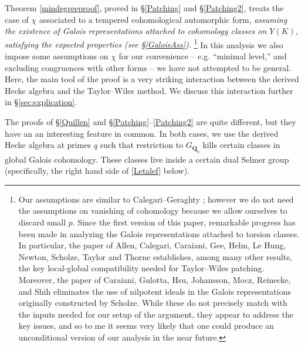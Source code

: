 \documentclass[10pt]{amsart}
\newcommand{\changecolor}{black}
\newcommand{\Q}{\mathbf{Q}}
\theoremstyle{remark}
\begin{document}
 Theorem \ref{mindegreeproof}, proved in   \S \ref{Patching} and \S \ref{Patching2}, treats the case of $\chi$ associated to a tempered cohomological automorphic form, {\em assuming 
  the existence of Galois representations attached to cohomology classes on $Y(K)$,
   satisfying the expected properties (see \S \ref{GaloisAss}). } \footnote{Our assumptions are similar to Calegari--Geraghty \cite{CG}; however we do not need
   the assumptions on vanishing of cohomology because we allow ourselves to discard small $p$. 
     {\color{\changecolor}   Since the first version of this paper, remarkable progress has been made in analyzing
    the Galois representations attached to torsion classes. In particular, the paper
    \cite[Theorem 3.11]{ManyAuthorPaper} of Allen, Calegari, Caraiani, Gee, Helm, Le Hung, Newton, Scholze, Taylor and Thorne
    establishes, among many other results,  the key local-global compatibility needed for Taylor--Wiles patching.
    Moreover, the paper \cite{SevenAuthorPaper} of Caraiani, Gulotta, Hsu, Johansson, Mocz, Reinecke, and Shih
      eliminates the use of nilpotent ideals in the
    Galois representations originally constructed by Scholze. While these do not precisely match with the inputs
    needed for our setup of the argument, they appear to  address the key  issues,  and so to me it seems very likely that 
    one could produce an unconditional version of our analysis in the near future.}}   In this analysis we also impose some assumptions on $\chi$ for our convenience -- e.g. ``minimal level,'' and excluding congruences with other forms --  we have not attempted
   to be general. Here, the main tool of the proof is a very striking interaction between the derived Hecke algebra and the Taylor--Wiles method. We discuss this interaction   further in \S \ref{sec:explication}. 

   
   
 
    
%
%
%
%
%
%
 
The proofs of \S \ref{Quillen} and \S \ref{Patching}--\ref{Patching2} are quite different, but they have an     
  an interesting   feature in common. In both cases, we use the derived Hecke algebra at primes $q$
such that restriction to $G_{\Q_q}$ kills certain classes in global Galois cohomology.
These classes live inside a certain dual Selmer group (specifically, the right hand side
of \eqref{Letalef} below).
\end{document}
